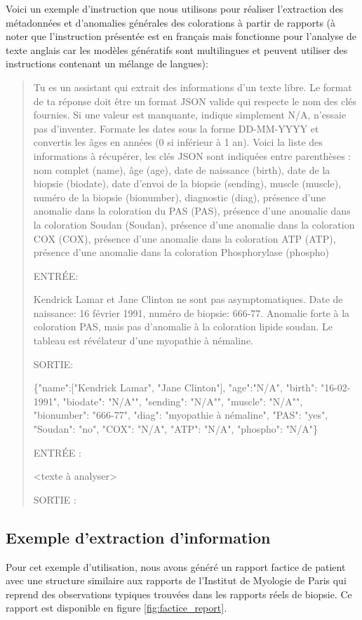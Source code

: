 Voici un exemple d'instruction que nous utilisons pour réaliser l'extraction des métadonnées et d'anomalies générales des colorations à partir de rapports (à noter que l'instruction présentée est en français mais fonctionne pour l'analyse de texte anglais car les modèles génératifs sont multilingues et peuvent utiliser des instructions contenant un mélange de langues):
\begin{quote}
Tu es un assistant qui extrait des informations d'un texte libre. Le format de ta réponse doit être un format JSON valide qui respecte le nom des clés fournies. Si une valeur est manquante, indique simplement N/A, n'essaie pas d'inventer. Formate les dates sous la forme DD-MM-YYYY et convertis les âges en années (0 si inférieur à 1 an). Voici la liste des informations à récupérer, les clés JSON sont indiquées entre parenthèses : nom complet (name), âge (age), date de naissance (birth), date de la biopsie (biodate), date d'envoi de la biopsie (sending), muscle (muscle), numéro de la biopsie (bionumber), diagnostic (diag), présence d'une anomalie dans la coloration du PAS (PAS), présence d'une anomalie dans la coloration Soudan (Soudan), présence d'une anomalie dans la coloration COX (COX), présence d'une anomalie dans la coloration ATP (ATP), présence d'une anomalie dans la coloration Phosphorylase (phospho)

ENTRÉE:

Kendrick Lamar et Jane Clinton ne sont pas asymptomatiques. Date de naissance: 16 février 1991, numéro de biopsie: 666-77. Anomalie forte à la coloration PAS, mais pas d'anomalie à la coloration lipide soudan. Le tableau est révélateur d'une myopathie à némaline.

SORTIE:

\{"name":["Kendrick Lamar", "Jane Clinton"], "age":"N/A", "birth": "16-02-1991", "biodate": "N/A"", "sending": "N/A"", "muscle": "N/A"", "bionumber": "666-77", "diag": "myopathie à némaline", "PAS": "yes", "Soudan": "no", "COX": "N/A", "ATP": "N/A", "phospho": "N/A"\}

ENTRÉE :

<texte à analyser>

SORTIE :
\end{quote}

\subsection{Exemple d'extraction d'information}
Pour cet exemple d'utilisation, nous avons généré un rapport factice de patient avec une structure similaire aux rapports de l'Institut de Myologie de Paris qui reprend des observations typiques trouvées dans les rapports réels de biopsie. Ce rapport est disponible en figure \ref{fig:factice_report}.

